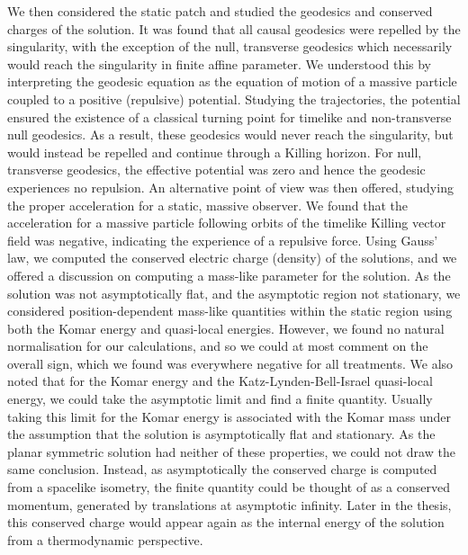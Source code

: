 We then considered the static patch and studied the geodesics and conserved charges of the solution. It was found that all causal geodesics were repelled by the singularity, with the exception of the null, transverse geodesics which necessarily would reach the singularity in finite affine parameter. We understood this by interpreting the geodesic equation as the equation of motion of a massive particle coupled to a positive (repulsive) potential. Studying the trajectories, the potential ensured the existence of a classical turning point for timelike and non-transverse null geodesics. As a result, these geodesics would never reach the singularity, but would instead be repelled and continue through a Killing horizon. For null, transverse geodesics, the effective potential was zero and hence the geodesic experiences no repulsion. An alternative point of view was then offered, studying the proper acceleration for a static, massive observer. We found that the acceleration for a massive particle following orbits of the timelike Killing vector field was negative, indicating the experience of a repulsive force. Using Gauss' law, we computed the conserved electric charge (density) of the solutions, and we offered a discussion on computing a mass-like parameter for the solution. As the solution was not asymptotically flat, and the asymptotic region not stationary, we considered position-dependent mass-like quantities within the static region using both the Komar energy and quasi-local energies. However, we found no natural normalisation for our calculations, and so we could at most comment on the overall sign, which we found was everywhere negative for all treatments. We also noted that for the Komar energy and the Katz-Lynden-Bell-Israel quasi-local energy, we could take the asymptotic limit and find a finite quantity. Usually taking this limit for the Komar energy is associated with the Komar mass under the assumption that the solution is asymptotically flat and stationary. As the planar symmetric solution had neither of these properties, we could not draw the same conclusion. Instead, as asymptotically the conserved charge is computed from a spacelike isometry, the finite quantity could be thought of as a conserved momentum, generated by translations at asymptotic infinity. Later in the thesis, this conserved charge would appear again as the internal energy of the solution from a thermodynamic perspective.

